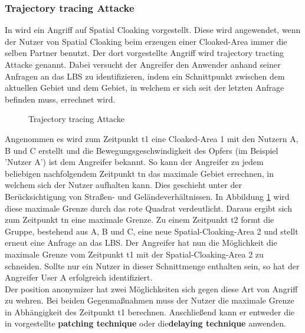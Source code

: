 \subsubsection{Trajectory tracing Attacke} 
In \cite{Chow2011} wird ein Angriff auf Spatial Cloaking vorgestellt. Diese wird angewendet, wenn der Nutzer von Spatial Cloaking beim erzeugen einer Cloaked-Area immer die selben Partner benutzt. Der dort vorgestellte Angriff wird trajectory tracting Attacke genannt. Dabei versucht der Angreifer den Anwender anhand seiner Anfragen an das LBS zu identifizieren, indem ein Schnittpunkt zwischen dem aktuellen Gebiet und dem Gebiet, in welchem er sich seit der letzten Anfrage befinden muss, errechnet wird. 
\begin{figure}[!h]
		\centering
		\caption{Trajectory tracing Attacke}
		\label{fig_chow2011_traj-tracing-att}
	\end{figure}
Angenommen es wird zum Zeitpunkt t1 eine Cloaked-Area 1 mit den Nutzern A, B und C erstellt und die Bewegungsgeschwindigkeit des Opfers (im Beispiel 'Nutzer A') ist dem Angreifer bekannt. So kann der Angreifer zu jedem beliebigen nachfolgendem Zeitpunkt tn das maximale Gebiet errechnen, in welchem sich der Nutzer aufhalten kann. Dies geschieht unter der Berücksichtigung von Straßen- und Geländeverhältnissen. In Abbildung \ref{fig_chow2011_traj-tracing-att} wird diese maximale Grenze durch das rote Quadrat verdeutlicht. Daraus ergibt sich zum Zeitpunkt tn eine maximale Grenze. Zu einem Zeitpunkt t2 formt die Gruppe, bestehend aus A, B und C, eine neue Spatial-Cloaking-Area 2 und stellt erneut eine Anfrage an das LBS. Der Angreifer hat nun die Möglichkeit die maximale Grenze vom Zeitpunkt t1 mit der Spatial-Cloaking-Area 2 zu schneiden. Sollte nur ein Nutzer in dieser Schnittmenge enthalten sein, so hat der Angreifer User A erfolgreich identifiziert.\\  Der position anonymizer hat zwei Möglichkeiten sich gegen diese Art von Angriff zu wehren. Bei beiden Gegenmaßnahmen muss der Nutzer die maximale Grenze in Abhängigkeit des Zeitpunkt t1 berechnen. Anschließend kann er entweder die in \cite{Chow2011} vorgestellte \textbf{patching technique} oder die\textbf{delaying technique} anwenden. 
